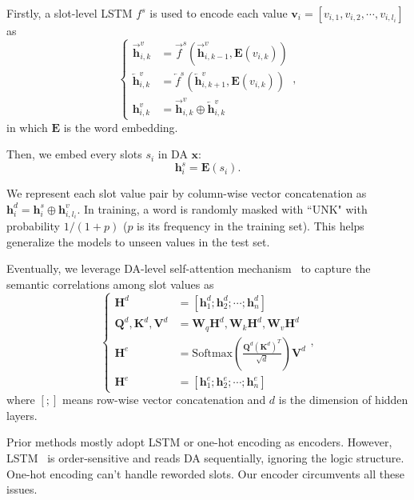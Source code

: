 \documentclass[letterpaper]{article} %
\begin{document}
	Firstly, a slot-level LSTM $f^{s}$ is used to encode each value $\mathbf{v}_i = [v_{i, 1}, v_{i, 2}, \cdots, v_{i, l_i}]$ as
	\begin{equation}
	\left\{\begin{aligned}
	\overrightarrow{\mathbf{h}}_{i,k}^v & = \overrightarrow{f}^s(\overrightarrow{\mathbf{h}}_{i,k-1}^v, \mathbf{E}(v_{i, k})) \\
	\overleftarrow{\mathbf{h}}_{i,k}^v & = \overleftarrow{f}^s(\overleftarrow{\mathbf{h}}_{i,k+1}^v, \mathbf{E}(v_{i, k})) \\ 
	\mathbf{h}_{i,k}^v & = \overrightarrow{\mathbf{h}}_{i,k}^v \oplus \overleftarrow{\mathbf{h}}_{i,k}^v
	\end{aligned}\right.,
	\end{equation}
	in which $\mathbf{E}$ is the word embedding. 
	
	Then, we embed every slots $s_i$ in DA $\mathbf{x}$:
	\begin{equation}
	\mathbf{h}^s_i = \mathbf{E}(s_i).
	\end{equation}
	
	We represent each slot value pair by column-wise vector concatenation as $\mathbf{h}^d_i = \mathbf{h}^s_i \oplus \mathbf{h}_{i,l_i}^v$.  In training, a word is randomly masked with ``UNK" with probability $1 / (1 + p)$ ($p$ is its frequency in the training set). This helps generalize the models to unseen values in the test set.
	
	Eventually, we leverage DA-level self-attention mechanism~\citep{vaswani2017attention} to capture the semantic correlations among slot values as 
	\begin{equation}
	\left\{\begin{aligned}
	\mathbf{H}^d & = [\mathbf{h}_1^d; \mathbf{h}_2^d; \cdots; \mathbf{h}_n^d] \\
	\mathbf{Q}^d, \mathbf{K}^d, \mathbf{V}^d & = \mathbf{W}_q\mathbf{H}^d, \mathbf{W}_k\mathbf{H}^d, \mathbf{W}_v\mathbf{H}^d \\
	\mathbf{H}^e & = \mathrm{Softmax}(\frac{\mathbf{Q}^d(\mathbf{K}^d)^T}{\sqrt{d}})\mathbf{V}^d \\
	\mathbf{H}^e & = [\mathbf{h}_1^e; \mathbf{h}_2^e; \cdots; \mathbf{h}_n^e]
	\end{aligned}\right.,
	\end{equation}
	where $[;]$ means row-wise vector concatenation and $d$ is the dimension of hidden layers.
	
	Prior methods mostly adopt LSTM or one-hot encoding as encoders. However, LSTM~\citep{hochreiter1997long} is order-sensitive and reads DA sequentially, ignoring the logic structure. One-hot encoding can't handle reworded slots. Our encoder circumvents all these issues.
	
\end{document}
